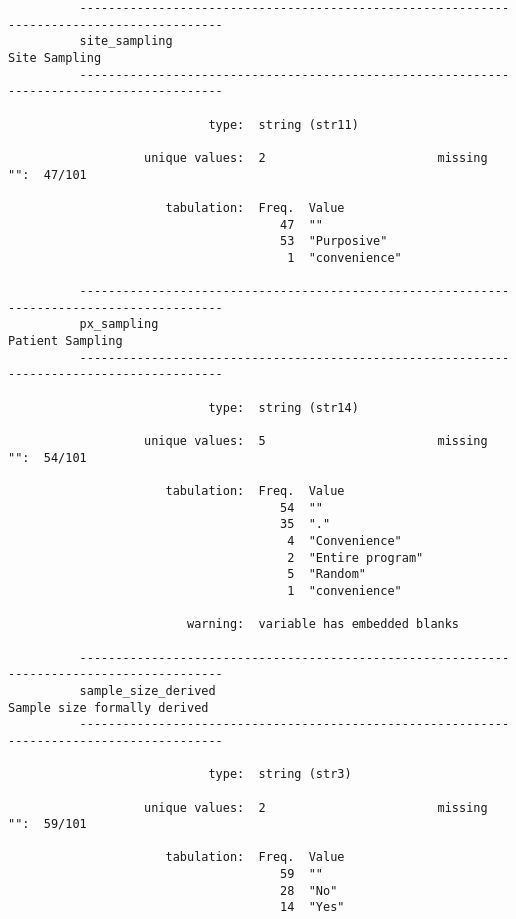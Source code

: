 \documentclass{article}
\begin{document}
\begin{verbatim}
          ------------------------------------------------------------------------------------------
          site_sampling                                                                Site Sampling
          ------------------------------------------------------------------------------------------
          
                            type:  string (str11)
          
                   unique values:  2                        missing "":  47/101
          
                      tabulation:  Freq.  Value
                                      47  ""
                                      53  "Purposive"
                                       1  "convenience"
          
          ------------------------------------------------------------------------------------------
          px_sampling                                                               Patient Sampling
          ------------------------------------------------------------------------------------------
          
                            type:  string (str14)
          
                   unique values:  5                        missing "":  54/101
          
                      tabulation:  Freq.  Value
                                      54  ""
                                      35  "."
                                       4  "Convenience"
                                       2  "Entire program"
                                       5  "Random"
                                       1  "convenience"
          
                         warning:  variable has embedded blanks
          
          ------------------------------------------------------------------------------------------
          sample_size_derived                                           Sample size formally derived
          ------------------------------------------------------------------------------------------
          
                            type:  string (str3)
          
                   unique values:  2                        missing "":  59/101
          
                      tabulation:  Freq.  Value
                                      59  ""
                                      28  "No"
                                      14  "Yes"
          

\end{verbatim}
\end{document}
